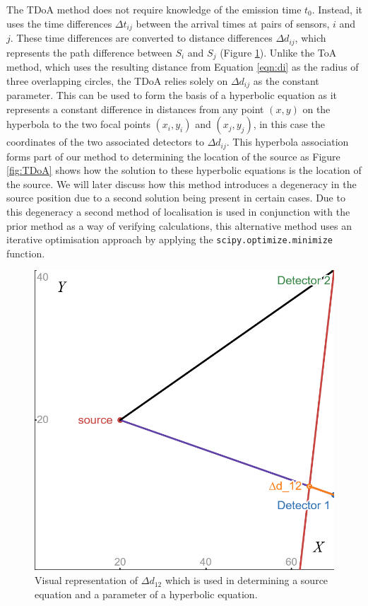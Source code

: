 The TDoA method does not require knowledge of the emission time \( t_0 \). Instead, it uses the time differences \( \Delta t_{ij} \) between the arrival times at pairs of sensors, $i$ and $j$. These time differences are converted to distance differences \( \Delta d_{ij} \), which represents the path difference between $S_i$ and $S_j$ (Figure \ref{fig:path-diff}). Unlike the ToA method, which uses the resulting distance from Equation \ref{eqn:di} as the radius of three overlapping circles, the TDoA relies solely on $\Delta d_{ij}$ as the constant parameter. This can be used to form the basis of a hyperbolic equation as it represents a constant difference in distances from any point $(x,y)$ on the hyperbola to the two focal points $(x_i,y_i)$ and $(x_j,y_j)$, in this case the coordinates of the two associated detectors to $\Delta d_{ij}$. This hyperbola association forms part of our method to determining the location of the source as Figure \ref{fig:TDoA} shows how the solution to these hyperbolic equations is the location of the source. We will later discuss how this method introduces a degeneracy in the source position due to a second solution being present in certain cases. Due to this degeneracy a second method of localisation is used in conjunction with the prior method as a way of verifying calculations, this alternative method uses an iterative optimisation approach by applying the \lstinline[]{scipy.optimize.minimize} function.

\begin{figure}
    \centering
    \includegraphics[width=0.5\linewidth]{images/desmos-graph.png}
    \caption{Visual representation of $\Delta d_{12}$ which is used in determining a source equation and a parameter of a hyperbolic equation.}
    \label{fig:path-diff}
\end{figure}

